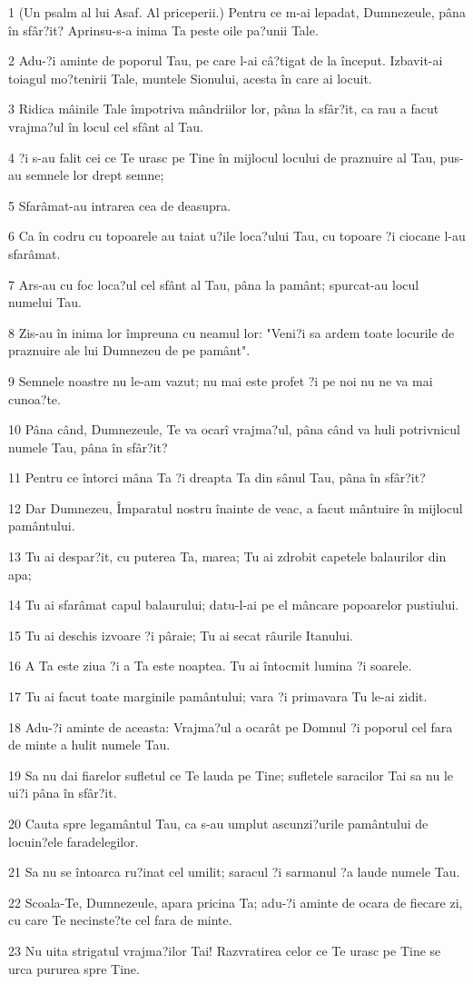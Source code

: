 \par 1 (Un psalm al lui Asaf. Al priceperii.) Pentru ce m-ai lepadat, Dumnezeule, pâna în sfâr?it? Aprinsu-s-a inima Ta peste oile pa?unii Tale.
\par 2 Adu-?i aminte de poporul Tau, pe care l-ai câ?tigat de la început. Izbavit-ai toiagul mo?tenirii Tale, muntele Sionului, acesta în care ai locuit.
\par 3 Ridica mâinile Tale împotriva mândriilor lor, pâna la sfâr?it, ca rau a facut vrajma?ul în locul cel sfânt al Tau.
\par 4 ?i s-au falit cei ce Te urasc pe Tine în mijlocul locului de praznuire al Tau, pus-au semnele lor drept semne;
\par 5 Sfarâmat-au intrarea cea de deasupra.
\par 6 Ca în codru cu topoarele au taiat u?ile loca?ului Tau, cu topoare ?i ciocane l-au sfarâmat.
\par 7 Ars-au cu foc loca?ul cel sfânt al Tau, pâna la pamânt; spurcat-au locul numelui Tau.
\par 8 Zis-au în inima lor împreuna cu neamul lor: "Veni?i sa ardem toate locurile de praznuire ale lui Dumnezeu de pe pamânt".
\par 9 Semnele noastre nu le-am vazut; nu mai este profet ?i pe noi nu ne va mai cunoa?te.
\par 10 Pâna când, Dumnezeule, Te va ocarî vrajma?ul, pâna când va huli potrivnicul numele Tau, pâna în sfâr?it?
\par 11 Pentru ce întorci mâna Ta ?i dreapta Ta din sânul Tau, pâna în sfâr?it?
\par 12 Dar Dumnezeu, Împaratul nostru înainte de veac, a facut mântuire în mijlocul pamântului.
\par 13 Tu ai despar?it, cu puterea Ta, marea; Tu ai zdrobit capetele balaurilor din apa;
\par 14 Tu ai sfarâmat capul balaurului; datu-l-ai pe el mâncare popoarelor pustiului.
\par 15 Tu ai deschis izvoare ?i pâraie; Tu ai secat râurile Itanului.
\par 16 A Ta este ziua ?i a Ta este noaptea. Tu ai întocmit lumina ?i soarele.
\par 17 Tu ai facut toate marginile pamântului; vara ?i primavara Tu le-ai zidit.
\par 18 Adu-?i aminte de aceasta: Vrajma?ul a ocarât pe Domnul ?i poporul cel fara de minte a hulit numele Tau.
\par 19 Sa nu dai fiarelor sufletul ce Te lauda pe Tine; sufletele saracilor Tai sa nu le ui?i pâna în sfâr?it.
\par 20 Cauta spre legamântul Tau, ca s-au umplut ascunzi?urile pamântului de locuin?ele faradelegilor.
\par 21 Sa nu se întoarca ru?inat cel umilit; saracul ?i sarmanul ?a laude numele Tau.
\par 22 Scoala-Te, Dumnezeule, apara pricina Ta; adu-?i aminte de ocara de fiecare zi, cu care Te necinste?te cel fara de minte.
\par 23 Nu uita strigatul vrajma?ilor Tai! Razvratirea celor ce Te urasc pe Tine se urca pururea spre Tine.

